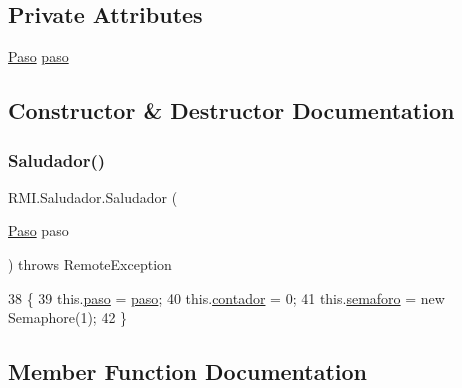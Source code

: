 \subsection*{Private Attributes}
\begin{DoxyCompactItemize}
\item 
\mbox{\hyperlink{class_r_m_i_1_1_paso}{Paso}} \mbox{\hyperlink{class_r_m_i_1_1_saludador_acf8f2452f97fd371135558ba37283fa4}{paso}}
\end{DoxyCompactItemize}


\subsection{Constructor \& Destructor Documentation}
\mbox{\label{class_r_m_i_1_1_saludador_a142d4fff5a3506d069b4a80a9e571de0}} 
\subsubsection{\texorpdfstring{Saludador()}{Saludador()}}
{\footnotesize\ttfamily R\+M\+I.\+Saludador.\+Saludador (\begin{DoxyParamCaption}\item[{\mbox{\hyperlink{class_r_m_i_1_1_paso}{Paso}}}]{paso }\end{DoxyParamCaption}) throws Remote\+Exception\hspace{0.3cm}{\ttfamily [inline]}}


\begin{DoxyCode}
38     \{
39         this.\mbox{\hyperlink{class_r_m_i_1_1_saludador_acf8f2452f97fd371135558ba37283fa4}{paso}} = \mbox{\hyperlink{class_r_m_i_1_1_saludador_acf8f2452f97fd371135558ba37283fa4}{paso}};
40         this.\mbox{\hyperlink{class_r_m_i_1_1_saludador_aee589ef80147254fc33e2b73d5f8ca2b}{contador}} = 0;
41         this.\mbox{\hyperlink{class_r_m_i_1_1_saludador_a772baa4676a1aa111b792ebd3d77cfcd}{semaforo}} = \textcolor{keyword}{new} Semaphore(1);
42     \}
\end{DoxyCode}


\subsection{Member Function Documentation}
\mbox{\label{class_r_m_i_1_1_saludador_a0d92560cbe25dfcfc18c73dfd3295fa4}} 
